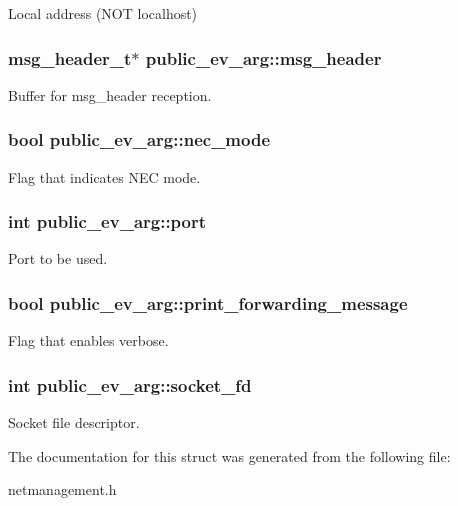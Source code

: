 \-Local address (\-N\-O\-T localhost) \hypertarget{structpublic__ev__arg_a6af12c28c65ebae88491cb1c5f4e20c8}{
\subsubsection[{msg\-\_\-header}]{\setlength{\rightskip}{0pt plus 5cm}msg\-\_\-header\-\_\-t$\ast$ {\bf public\-\_\-ev\-\_\-arg\-::msg\-\_\-header}}}\label{structpublic__ev__arg_a6af12c28c65ebae88491cb1c5f4e20c8}
\-Buffer for msg\-\_\-header reception. \hypertarget{structpublic__ev__arg_a7587ccf7cff367692653f0232f8e3ea2}{
\subsubsection[{nec\-\_\-mode}]{\setlength{\rightskip}{0pt plus 5cm}bool {\bf public\-\_\-ev\-\_\-arg\-::nec\-\_\-mode}}}\label{structpublic__ev__arg_a7587ccf7cff367692653f0232f8e3ea2}
\-Flag that indicates \-N\-E\-C mode. \hypertarget{structpublic__ev__arg_a1437cfc3f0d5b9d5ee3f6754b93a44df}{
\subsubsection[{port}]{\setlength{\rightskip}{0pt plus 5cm}int {\bf public\-\_\-ev\-\_\-arg\-::port}}}\label{structpublic__ev__arg_a1437cfc3f0d5b9d5ee3f6754b93a44df}
\-Port to be used. \hypertarget{structpublic__ev__arg_a8ab1326ed333f4d4678ed8fa30633376}{
\subsubsection[{print\-\_\-forwarding\-\_\-message}]{\setlength{\rightskip}{0pt plus 5cm}bool {\bf public\-\_\-ev\-\_\-arg\-::print\-\_\-forwarding\-\_\-message}}}\label{structpublic__ev__arg_a8ab1326ed333f4d4678ed8fa30633376}
\-Flag that enables verbose. \hypertarget{structpublic__ev__arg_a634c9a03c6dfe3c9991778e81e07f1a8}{
\subsubsection[{socket\-\_\-fd}]{\setlength{\rightskip}{0pt plus 5cm}int {\bf public\-\_\-ev\-\_\-arg\-::socket\-\_\-fd}}}\label{structpublic__ev__arg_a634c9a03c6dfe3c9991778e81e07f1a8}
\-Socket file descriptor. 

\-The documentation for this struct was generated from the following file\-:\begin{DoxyCompactItemize}
\item 
netmanagement.\-h\end{DoxyCompactItemize}
